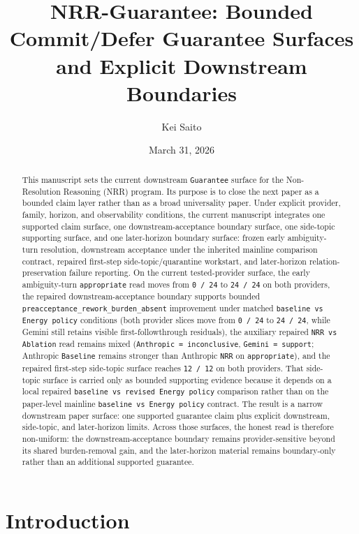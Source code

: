 \documentclass[11pt]{article}
\title{NRR-Guarantee: Bounded Commit/Defer Guarantee Surfaces and Explicit Downstream Boundaries}
\author{Kei Saito}
\date{March 31, 2026}
\begin{document}
\maketitle

\begin{abstract}
This manuscript sets the current downstream \texttt{Guarantee} surface for the
Non-Resolution Reasoning (NRR) program. Its purpose is to close the next paper
as a bounded claim layer rather than as a broad universality paper. Under
explicit provider, family, horizon, and observability conditions, the current
manuscript integrates one supported claim surface, one downstream-acceptance
boundary surface, one side-topic supporting surface, and one later-horizon
boundary surface: frozen early ambiguity-turn resolution, downstream
acceptance under the inherited mainline comparison contract, repaired
first-step side-topic/quarantine workstart, and later-horizon
relation-preservation failure reporting. On the current tested-provider
surface, the early ambiguity-turn \texttt{appropriate} read moves from
\texttt{0 / 24} to \texttt{24 / 24} on both providers, the repaired
downstream-acceptance boundary supports bounded
\texttt{preacceptance\_rework\_burden\_absent} improvement under matched
\texttt{baseline vs Energy policy} conditions (both provider slices move from
\texttt{0 / 24} to \texttt{24 / 24}, while Gemini still retains visible
first-followthrough residuals), the auxiliary repaired
\texttt{NRR vs Ablation} read remains mixed
(\texttt{Anthropic = inconclusive}, \texttt{Gemini = support}; Anthropic
\texttt{Baseline} remains stronger than Anthropic \texttt{NRR} on
\texttt{appropriate}), and the
repaired first-step side-topic surface reaches \texttt{12 / 12} on both
providers. That side-topic surface is carried only as bounded supporting
evidence because it depends on a local repaired
\texttt{baseline vs revised Energy policy} comparison rather than on the
paper-level mainline \texttt{baseline vs Energy policy} contract. The result is
a narrow downstream paper surface: one supported guarantee claim plus explicit
downstream, side-topic, and later-horizon limits. Across those surfaces, the
honest read is therefore non-uniform: the
downstream-acceptance boundary remains provider-sensitive beyond its shared
burden-removal gain, and the later-horizon material remains boundary-only
rather than an additional supported guarantee.
\end{abstract}

\section{Introduction}
\end{document}
